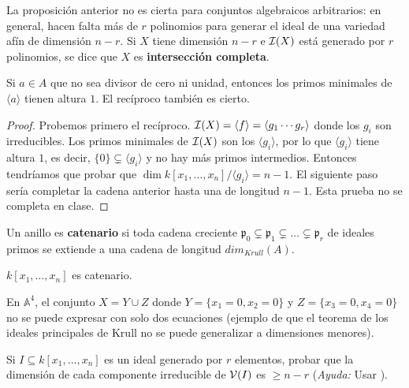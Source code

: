\documentclass[ACGA.tex]{subfiles}
\begin{document}
La proposición anterior no es cierta para conjuntos algebraicos arbitrarios: en general, hacen falta más de $r$ polinomios para generar el ideal de una variedad afín de dimensión $n-r$. Si $X$ tiene dimensión $n-r$ e $\mathcal{I}(X)$ está generado por $r$ polinomios, se dice que $X$ es {\bf intersección completa}.

\begin{teorema}
Si $a\in A$ que no sea divisor de cero ni unidad, entonces los primos minimales de $\langle a\rangle$ tienen altura $1$. El recíproco también es cierto.
\end{teorema}
\begin{proof}
Probemos primero el recíproco. $\mathcal{I}(X)=\langle f\rangle =\langle g_1\cdots g_r\rangle$ donde los $g_i$ son irreducibles. Los primos minimales de $\mathcal{I}(X)$ son los $\langle g_i\rangle$, por lo que $\langle g_i\rangle$ tiene altura $1$, es decir, $\{0\}\subsetneq \langle g_i\rangle$ y no hay más primos intermedios. Entonces tendríamos que probar que $\dim k[x_1,\dots,x_n]/\langle g_i\rangle =n-1$. El siguiente paso sería completar la cadena anterior hasta una de longitud $n-1$. Esta prueba no se completa en clase.
\end{proof}

\begin{defi}
Un anillo es {\bf catenario } si toda cadena creciente $\mathfrak{p}_0\subsetneq\mathfrak{p}_1\subsetneq\dots\subsetneq\mathfrak{p}_r$ de ideales primos se extiende a una cadena de longitud $dim_{Krull}(A)$. 
\end{defi}

\begin{teorema}
$k[x_1,\dots,x_n]$ es catenario.
\end{teorema}

\begin{ejer}
En $\mathbb{A}^4$, el conjunto $X=Y\cup Z$ donde $Y=\{x_1=0,x_2=0\}$ y $Z=\{x_3=0,x_4=0\}$ no se puede expresar con solo dos ecuaciones (ejemplo de que el teorema de los ideales principales de Krull no se puede generalizar a dimensiones menores). 
\end{ejer}



\begin{ejer}\label{dimensionmayor}
 Si $I\subseteq k[x_1,\ldots,x_n]$ es un ideal generado por $r$ elementos, probar que la dimensión de cada componente irreducible de $\mathcal{V}(I)$ es $\geq n-r$ (\emph{Ayuda:} Usar \cite[corolario 1.16]{am}).
\end{ejer}
\end{document}
